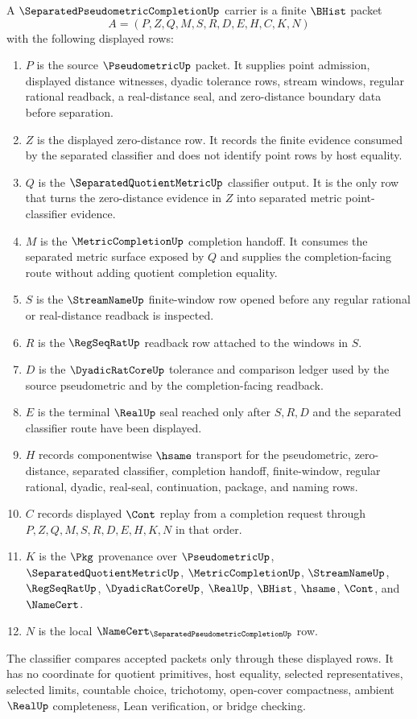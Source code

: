 \begin{definition}
\label{def:separated-pseudometric-completion-carrier}
A $\SeparatedPseudometricCompletionUp$ carrier is a finite $\BHist$ packet
$$
A=(P,Z,Q,M,S,R,D,E,H,C,K,N)
$$
with the following displayed rows:
\begin{enumerate}
\item $P$ is the source $\PseudometricUp$ packet. It supplies point admission, displayed distance witnesses, dyadic tolerance rows, stream windows, regular rational readback, a real-distance seal, and zero-distance boundary data before separation.
\item $Z$ is the displayed zero-distance row. It records the finite evidence consumed by the separated classifier and does not identify point rows by host equality.
\item $Q$ is the $\SeparatedQuotientMetricUp$ classifier output. It is the only row that turns the zero-distance evidence in $Z$ into separated metric point-classifier evidence.
\item $M$ is the $\MetricCompletionUp$ completion handoff. It consumes the separated metric surface exposed by $Q$ and supplies the completion-facing route without adding quotient completion equality.
\item $S$ is the $\StreamNameUp$ finite-window row opened before any regular rational or real-distance readback is inspected.
\item $R$ is the $\RegSeqRatUp$ readback row attached to the windows in $S$.
\item $D$ is the $\DyadicRatCoreUp$ tolerance and comparison ledger used by the source pseudometric and by the completion-facing readback.
\item $E$ is the terminal $\RealUp$ seal reached only after $S,R,D$ and the separated classifier route have been displayed.
\item $H$ records componentwise $\hsame$ transport for the pseudometric, zero-distance, separated classifier, completion handoff, finite-window, regular rational, dyadic, real-seal, continuation, package, and naming rows.
\item $C$ records displayed $\Cont$ replay from a completion request through $P,Z,Q,M,S,R,D,E,H,K,N$ in that order.
\item $K$ is the $\Pkg$ provenance over $\PseudometricUp$, $\SeparatedQuotientMetricUp$, $\MetricCompletionUp$, $\StreamNameUp$, $\RegSeqRatUp$, $\DyadicRatCoreUp$, $\RealUp$, $\BHist$, $\hsame$, $\Cont$, and $\NameCert$.
\item $N$ is the local $\NameCert_{\SeparatedPseudometricCompletionUp}$ row.
\end{enumerate}
The classifier compares accepted packets only through these displayed rows. It has no coordinate for quotient primitives, host equality, selected representatives, selected limits, countable choice, trichotomy, open-cover compactness, ambient $\RealUp$ completeness, Lean verification, or bridge checking.
\end{definition}

